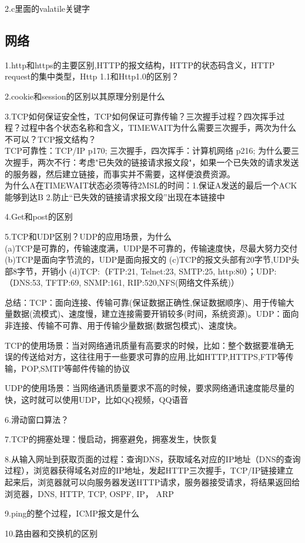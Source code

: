 2.c里面的valatile关键字
\subsection{网络}
1.http和https的主要区别,HTTP的报文结构，HTTP的状态码含义，HTTP request的集中类型，Http 1.1和Http1.0的区别？

2.cookie和session的区别以其原理分别是什么

3.TCP如何保证安全性，TCP如何保证可靠传输？三次握手过程？四次挥手过程？过程中各个状态名称和含义，TIMEWAIT为什么需要三次握手，两次为什么不可以？TCP报文结构？\\
TCP可靠性：TCP/IP p170; 三次握手，四次挥手：计算机网络 p216;
为什么要三次握手，两次不行：考虑"已失效的链接请求报文段"，如果一个已失效的请求发送的服务器，然后建立链接，而事实并不需要，这样便浪费资源。\\
为什么A在TIMEWAIT状态必须等待2MSL的时间：1.保证A发送的最后一个ACK能够到达B 2.防止“已失效的链接请求报文段”出现在本链接中

4.Get和post的区别

5.TCP和UDP区别？UDP的应用场景，为什么\\
(a)TCP是可靠的，传输速度满，UDP是不可靠的，传输速度快，尽最大努力交付
(b)TCP是面向字节流的，UDP是面向报文的
(c)TCP的报文头部有20字节,UDP头部8字节，开销小
(d)TCP:（FTP:21, Telnet:23, SMTP:25, http:80）；UDP:（DNS:53, TFTP:69, SNMP:161, RIP:520,NFS(网络文件系统)）

总结：TCP：面向连接、传输可靠(保证数据正确性,保证数据顺序)、用于传输大量数据(流模式)、速度慢，建立连接需要开销较多(时间，系统资源)。UDP：面向非连接、传输不可靠、用于传输少量数据(数据包模式)、速度快。

TCP的使用场景：当对网络通讯质量有高要求的时候，比如：整个数据要准确无误的传送给对方，这往往用于一些要求可靠的应用,比如HTTP,HTTPS,FTP等传输，POP,SMTP等邮件传输的协议

UDP的使用场景：当网络通讯质量要求不高的时候，要求网络通讯速度能尽量的快，这时就可以使用UDP，比如QQ视频，QQ语音

6.滑动窗口算法？

7.TCP的拥塞处理：慢启动，拥塞避免，拥塞发生，快恢复

8.从输入网址到获取页面的过程：查询DNS，获取域名对应的IP地址（DNS的查询过程），浏览器获得域名对应的IP地址，发起HTTP三次握手，TCP/IP链接建立起来后，浏览器就可以向服务器发送HTTP请求，服务器接受请求，将结果返回给浏览器，DNS, HTTP, TCP, OSPF, IP， ARP

9.ping的整个过程，ICMP报文是什么

10.路由器和交换机的区别


